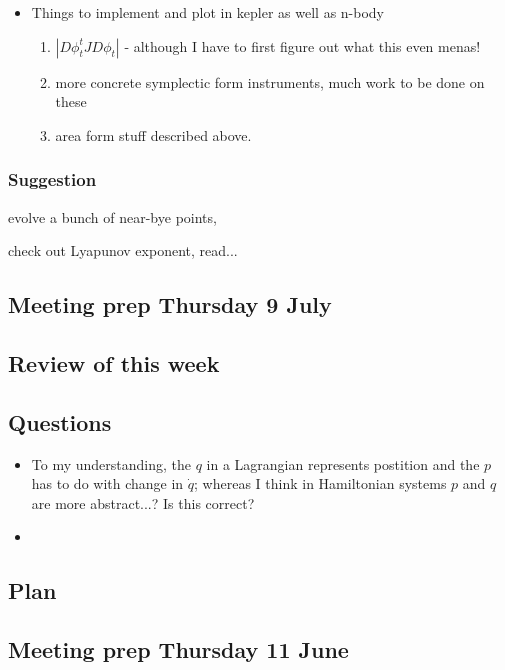 \documentclass[12pt]{article}
\begin{document}
\begin{itemize}
    \item Things to implement and plot in kepler as well as n-body 
    \begin{enumerate}
        \item $\left| D\phi_t^t J D\phi_t\right|$ - although I have to first figure out what this even menas!
        \item more concrete symplectic form instruments, much work to be done on these
        \item area form stuff described above. 
    \end{enumerate}
\end{itemize}

\subsubsection{Suggestion}
evolve a bunch of near-bye points, 

check out Lyapunov exponent, read...

\subsection{Meeting prep Thursday 9 July}
\subsection{Review of this week}

\subsection{Questions}
\begin{itemize}
    \item To my understanding, the $q$ in a Lagrangian represents postition and the $p$ has to do with change in $\dot q$; whereas I think in Hamiltonian systems $p$ and $q$ are more abstract...? Is this correct?
    \item 
\end{itemize}

\subsection{Plan}

\subsection{Meeting prep Thursday 11 June}
\end{document}
